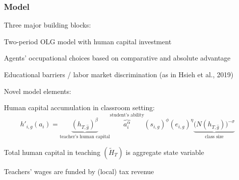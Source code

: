 \documentclass[11pt,hyperref={bookmarks=false},table,aspectratio=169]{beamer}
\begin{document}
%

	\begin{frame}
		\frametitle{Model}
\alert{Three major building blocks:}
		\begin{enumerate}
			\small{\item Two-period OLG model with human capital investment
			\item Agents' occupational choices based on comparative and absolute advantage
			\item Educational barriers / labor market discrimination (as in Hsieh et al., 2019)}
		\end{enumerate}
		
\alert{Novel model elements:}

		{\begin{itemize}
			\small{\item Human capital accumulation in classroom setting:
			\begin{displaymath}
				h'_{i,g}(a_i) =\underbrace{\left( h_{T,\hat{g}} \right)^\beta}_{\textrm{teacher's human capital}} \overbrace{a_i^\alpha}^{\textrm{student's ability}} (s_{i,g})^{\phi} (e_{i,g})^{\eta}\underbrace{\big(N(h_{T,\hat{g}})\big)^{-\sigma}}_{\textrm{class size}}
			\end{displaymath}
			\item Total human capital in teaching $(\tilde{H}_T)$ is aggregate state variable}
			\item Teachers' wages are funded by (local) tax revenue
		\end{itemize}}
	\end{frame}
	
\end{document}
